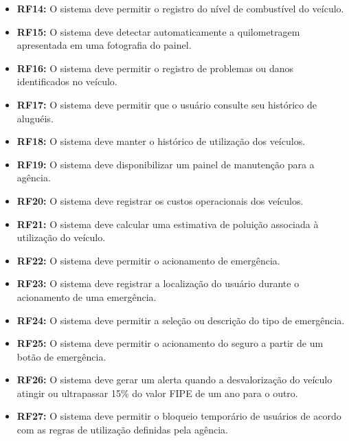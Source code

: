 \documentclass[12pt,a4paper]{report}
\begin{document}
\begin{itemize}
    \item \textbf{RF14:} O sistema deve permitir o registro do
    nível de combustível do veículo.

    \item \textbf{RF15:} O sistema deve detectar automaticamente
    a quilometragem apresentada em uma fotografia do painel.

    \item \textbf{RF16:} O sistema deve permitir o registro de
    problemas ou danos identificados no veículo.

    \item \textbf{RF17:} O sistema deve permitir que o usuário
    consulte seu histórico de aluguéis.

    \item \textbf{RF18:} O sistema deve manter o histórico de
    utilização dos veículos.

    \item \textbf{RF19:} O sistema deve disponibilizar um painel
    de manutenção para a agência.

    \item \textbf{RF20:} O sistema deve registrar os custos
    operacionais dos veículos.

    \item \textbf{RF21:} O sistema deve calcular uma estimativa
    de poluição associada à utilização do veículo.

    \item \textbf{RF22:} O sistema deve permitir o acionamento
    de emergência.

    \item \textbf{RF23:} O sistema deve registrar a localização
    do usuário durante o acionamento de uma emergência.

    \item \textbf{RF24:} O sistema deve permitir a seleção ou
    descrição do tipo de emergência.

    \item \textbf{RF25:} O sistema deve permitir o acionamento
    do seguro a partir de um botão de emergência.

    \item \textbf{RF26:} O sistema deve gerar um alerta quando a
    desvalorização do veículo atingir ou ultrapassar 15\% do
    valor FIPE de um ano para o outro.

    \item \textbf{RF27:} O sistema deve permitir o bloqueio
    temporário de usuários de acordo com as regras de utilização
    definidas pela agência.



\end{itemize}
\end{document}
